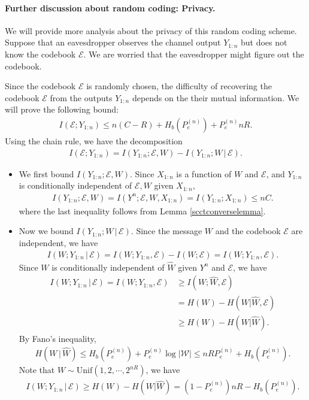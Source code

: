 \documentclass{article}
\numberwithin{equation}{section}
\renewcommand{\cal}{\mathcal}
\newcommand{\wh}{\widehat}
\theoremstyle{plain}
\theoremstyle{definition}
\begin{document}
\paragraph{Further discussion about random coding: Privacy.} We will provide more analysis about the privacy of this random coding scheme. Suppose that an eavesdropper observes the channel output $Y_{1:n}$ but does not know the
codebook $\cal{E}$. We are worried that the eavesdropper might figure out the codebook. 

Since the codebook $\cal{E}$ is randomly chosen, the difficulty of recovering the codebook $\cal{E}$ from the outputs $Y_{1:n}$ depends on the their mutual information. We will prove the following bound:
\begin{align*}
	I(\mathcal{E};Y_{1:n})\leq n(C-R)+H_b(P_e^{(n)})+P_e^{(n)}nR.
\end{align*}
Using the chain rule, we have the decomposition
\begin{align*}
	I(\mathcal{E};Y_{1:n})=I(Y_{1:n};\cal{E},W)-I(Y_{1:n};W\,|\,\cal{E}).
\end{align*}
\begin{itemize}
\item We first bound $I(Y_{1:n};\cal{E},W)$. Since $X_{1:n}$ is a function of $W$ and $\cal{E}$, and $Y_{1:n}$ is conditionally independent of $\cal{E},W$ given $X_{1:n}$,
	\begin{align*}
		I(Y_{1:n};\cal{E},W)=I(Y^n;\cal{E},W,X_{1:n})=I(Y_{1:n};X_{1:n})\leq nC.
	\end{align*}
	where the last inequality follows from Lemma \ref{scctconverselemma}.
	
\item Now we bound $I(Y_{1:n};W\,|\,\cal{E})$. Since the message $W$ and the codebook $\cal{E}$ are independent, we have
	\begin{align*}
		I(W;Y_{1:n}\,|\,\cal{E})=I(W;Y_{1:n},\cal{E})-I(W;\cal{E})=I(W;Y_{1:n},\cal{E}).
	\end{align*}
	Since $W$ is conditionally independent of $\wh{W}$ given $Y^n$ and $\cal{E}$, we have
	\begin{align*}
		I(W;Y_{1:n}\,|\,\cal{E})=I(W;Y_{1:n},\cal{E})&\geq I(W;\wh{W},\cal{E})\tag{data processing inequality}\\
		&=H(W)-H(W|\wh{W},\cal{E})\tag{chain rule}\\
		&\geq H(W)-H(W|\wh{W}).\tag{Conditioning does not increase entropy}
	\end{align*}
	By Fano's inequality,
	\begin{align*}
		H(W\,|\,\wh{W})\leq H_b(P_e^{(n)})+P_e^{(n)}\log\vert\cal{W}\vert\leq nRP_e^{(n)}+H_b(P_e^{(n)}).
	\end{align*}
	Note that $W\sim\mathrm{Unif}(1,2,\cdots,2^{nR})$, we have
	\begin{align*}
		I(W;Y_{1:n}\,|\,\cal{E})\geq H(W)-H(W|\wh{W})=(1-P_e^{(n)})nR-H_b(P_e^{(n)}).
	\end{align*}
\end{itemize}
\end{document}
